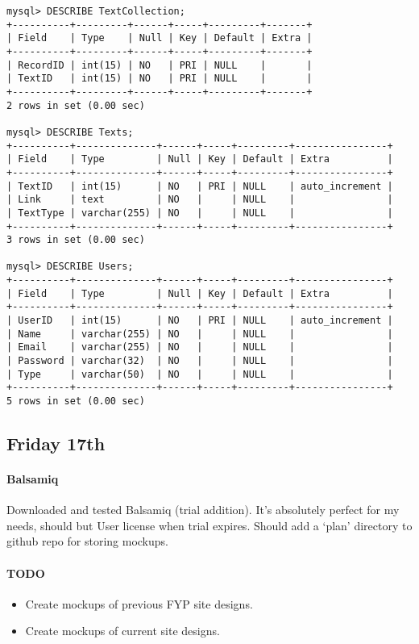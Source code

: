 \begin{verbatim}
mysql> DESCRIBE TextCollection;
+----------+---------+------+-----+---------+-------+
| Field    | Type    | Null | Key | Default | Extra |
+----------+---------+------+-----+---------+-------+
| RecordID | int(15) | NO   | PRI | NULL    |       |
| TextID   | int(15) | NO   | PRI | NULL    |       |
+----------+---------+------+-----+---------+-------+
2 rows in set (0.00 sec)

mysql> DESCRIBE Texts;
+----------+--------------+------+-----+---------+----------------+
| Field    | Type         | Null | Key | Default | Extra          |
+----------+--------------+------+-----+---------+----------------+
| TextID   | int(15)      | NO   | PRI | NULL    | auto_increment |
| Link     | text         | NO   |     | NULL    |                |
| TextType | varchar(255) | NO   |     | NULL    |                |
+----------+--------------+------+-----+---------+----------------+
3 rows in set (0.00 sec)

mysql> DESCRIBE Users;
+----------+--------------+------+-----+---------+----------------+
| Field    | Type         | Null | Key | Default | Extra          |
+----------+--------------+------+-----+---------+----------------+
| UserID   | int(15)      | NO   | PRI | NULL    | auto_increment |
| Name     | varchar(255) | NO   |     | NULL    |                |
| Email    | varchar(255) | NO   |     | NULL    |                |
| Password | varchar(32)  | NO   |     | NULL    |                |
| Type     | varchar(50)  | NO   |     | NULL    |                |
+----------+--------------+------+-----+---------+----------------+
5 rows in set (0.00 sec)
\end{verbatim}

\subsection{Friday 17th}
\paragraph{Balsamiq} Downloaded and tested Balsamiq (trial addition). It's
absolutely perfect for my needs, should but User license when trial
expires. Should add a `plan' directory to github repo for storing mockups.

\paragraph{TODO}
\begin{itemize}
\item Create mockups of previous FYP site designs.
\item Create mockups of current site designs.
\end{itemize}

